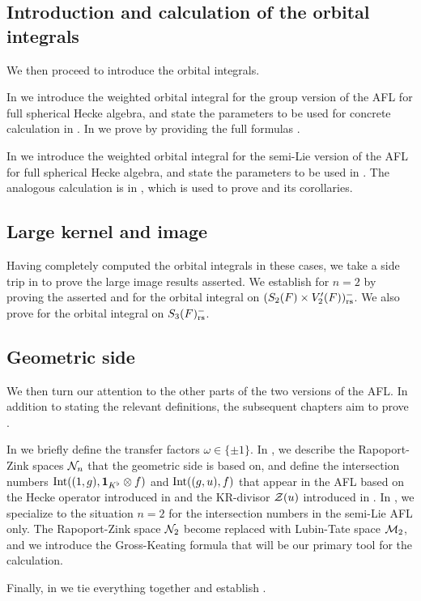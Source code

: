 \subsection{Introduction and calculation of the orbital integrals}
We then proceed to introduce the orbital integrals.
\begin{itemize}
  \ii In  we introduce the weighted orbital integral
  for the group version of the AFL for full spherical Hecke algebra,
  and state the parameters to be used for concrete calculation in .
  In  we prove 
  by providing the full formulas
  .

  \ii In  we introduce the weighted orbital integral
  for the semi-Lie version of the AFL for full spherical Hecke algebra,
  and state the parameters to be used in .
  The analogous calculation is in ,
  which is used to prove  and its corollaries.
\end{itemize}

\subsection{Large kernel and image}
Having completely computed the orbital integrals in these cases,
we take a side trip in  to prove the large image results asserted.
We establish  for $n = 2$ by proving the asserted
 and 
for the orbital integral on $(S_2(F) \times V'_2(F))_{\mathrm{rs}}^-$.
We also prove  for the orbital integral on $S_3(F)_{\mathrm{rs}}^-$.

\subsection{Geometric side}
We then turn our attention to the other parts of the two versions of the AFL.
In addition to stating the relevant definitions,
the subsequent chapters aim to prove .
\begin{itemize}
  \ii In  we briefly define the transfer factors $\omega \in \{\pm1\}$.
  \ii In , we describe the Rapoport-Zink spaces $\mathcal N_n$
  that the geometric side is based on, and define the intersection numbers
  $\operatorname{Int}((1,g), \mathbf{1}_{K^\flat} \otimes f)$ and $\operatorname{Int}((g,u), f)$
  that appear in the AFL based on the Hecke operator introduced in \cite{ref:AFLspherical}
  and the KR-divisor $\mathcal Z(u)$ introduced in \cite{ref:KR}.
  \ii In , we specialize to the situation $n = 2$
  for the intersection numbers in the semi-Lie AFL only.
  The Rapoport-Zink space $\mathcal N_2$ become replaced with Lubin-Tate space $\mathcal M_2$,
  and we introduce the Gross-Keating formula
  that will be our primary tool for the calculation.
\end{itemize}
Finally, in  we tie everything together and establish
.


